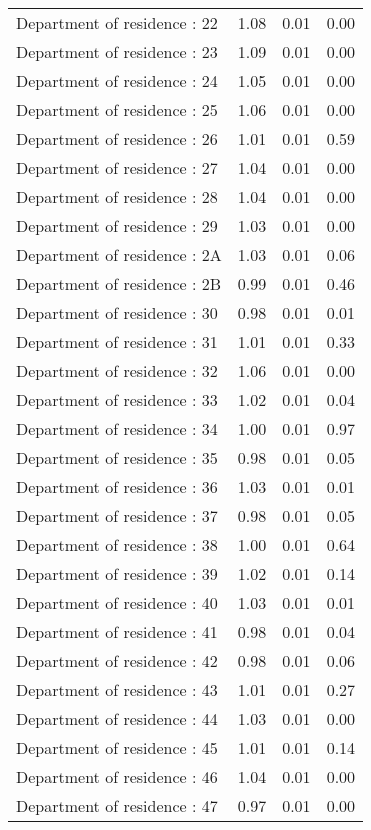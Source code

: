 \documentclass[risks,article,submit,moreauthors,pdftex]{Definitions/mdpi}
\begin{document}
\begin{longtable}{lrrr}
Department of residence : 22 & 1.08 & 0.01 & 0.00 \\ 
Department of residence : 23 & 1.09 & 0.01 & 0.00 \\ 
Department of residence : 24 & 1.05 & 0.01 & 0.00 \\ 
Department of residence : 25 & 1.06 & 0.01 & 0.00 \\ 
Department of residence : 26 & 1.01 & 0.01 & 0.59 \\ 
Department of residence : 27 & 1.04 & 0.01 & 0.00 \\ 
Department of residence : 28 & 1.04 & 0.01 & 0.00 \\ 
Department of residence : 29 & 1.03 & 0.01 & 0.00 \\ 
Department of residence : 2A & 1.03 & 0.01 & 0.06 \\ 
Department of residence : 2B & 0.99 & 0.01 & 0.46 \\ 
Department of residence : 30 & 0.98 & 0.01 & 0.01 \\ 
Department of residence : 31 & 1.01 & 0.01 & 0.33 \\ 
Department of residence : 32 & 1.06 & 0.01 & 0.00 \\ 
Department of residence : 33 & 1.02 & 0.01 & 0.04 \\ 
Department of residence : 34 & 1.00 & 0.01 & 0.97 \\ 
Department of residence : 35 & 0.98 & 0.01 & 0.05 \\ 
Department of residence : 36 & 1.03 & 0.01 & 0.01 \\ 
Department of residence : 37 & 0.98 & 0.01 & 0.05 \\ 
Department of residence : 38 & 1.00 & 0.01 & 0.64 \\ 
Department of residence : 39 & 1.02 & 0.01 & 0.14 \\ 
Department of residence : 40 & 1.03 & 0.01 & 0.01 \\ 
Department of residence : 41 & 0.98 & 0.01 & 0.04 \\ 
Department of residence : 42 & 0.98 & 0.01 & 0.06 \\ 
Department of residence : 43 & 1.01 & 0.01 & 0.27 \\ 
Department of residence : 44 & 1.03 & 0.01 & 0.00 \\ 
Department of residence : 45 & 1.01 & 0.01 & 0.14 \\ 
Department of residence : 46 & 1.04 & 0.01 & 0.00 \\ 
Department of residence : 47 & 0.97 & 0.01 & 0.00 \\ 

\end{longtable}
\end{document}

